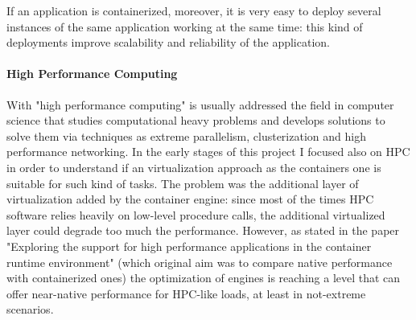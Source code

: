   If an application is containerized, moreover, it is very easy to deploy several instances of the same application working at the same time: this kind of deployments improve scalability and reliability of the application.\\

\paragraph{High Performance Computing}
  With "high performance computing" is usually addressed the field in computer science that studies computational heavy problems and develops solutions to solve them via techniques as extreme parallelism, clusterization and high performance networking. In the early stages of this project I focused also on HPC in order to understand if an virtualization approach as the containers one is suitable for such kind of tasks. The problem was the additional layer of virtualization added by the container engine: since most of the times HPC software relies heavily on low-level procedure calls, the additional virtualized layer could degrade too much the performance. However, as stated in the paper "Exploring the support for high performance applications in the container runtime environment"\cite{containershpc2} (which original aim was to compare native performance with containerized ones) the optimization of engines is reaching a level that can offer near-native performance for HPC-like loads, at least in not-extreme scenarios.
